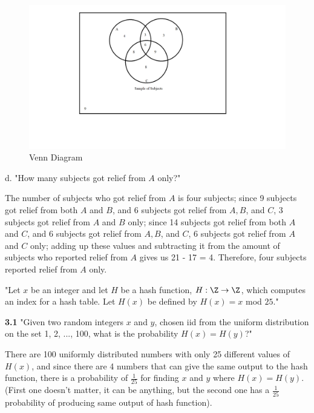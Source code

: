 \documentclass{article}
\begin{document}
\begin{figure}[h!]
  \includegraphics[width=\linewidth]{Untitled.png}
  \caption{Venn Diagram}
  \label{fig:map1}
\end{figure}

\item[]d. "How many subjects got relief from $A$ only?"

The number of subjects who got relief from $A$ is four subjects; since 9 subjects got relief from both $A$ and $B$, and 6 subjects got relief from $A, B$, and $C$, 3 subjects got relief from $A$ and $B$ only; since 14 subjects got relief from both $A$ and $C$, and 6 subjects got relief from $A, B$, and $C$, 6 subjects got relief from $A$ and $C$ only; adding up these values and subtracting it from the amount of subjects who reported relief from $A$ gives us 21 - 17 = 4. Therefore, four subjects reported relief from $A$ only.

\clearpage
\header
"Let $x$ be an integer and let $H$ be a hash function, $H: \Z \rightarrow \Z$, which computes an index for a hash table. Let $H(x)$ be defined by $H(x)=x$ mod $25$."
\item\textbf{3.1} "Given two random integers $x$ and $y$, chosen iid from the uniform distribution on the set {1, 2, ..., 100}, what is the probability $H(x)=H(y)$?"
\item There are 100 uniformly distributed numbers with only 25 different values of $H(x)$, and since there are 4 numbers that can give the same output to the hash function, there is a probability of $\frac{1}{25}$ for finding $x$ and $y$ where $H(x) = H(y)$. (First one doesn't matter, it can be anything, but the second one has a $\frac{1}{25}$ probability of producing same output of hash function).
\end{document}
